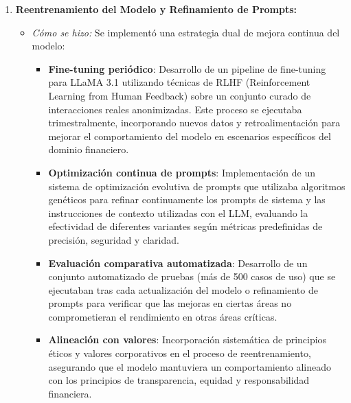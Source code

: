 \documentclass[12pt]{article}
\begin{document}
\begin{enumerate}
\begin{itemize}
            \item \textit{Resultados clave:} Las auditorías realizadas han identificado 23 oportunidades de mejora, de las cuales 17 ya han sido implementadas, resultando en una mejora del 12%
            \item \textit{Propósito:} Este enfoque sistemático garantiza la evaluación periódica y mejora del sistema, conforme al Art. 7.3.5 de la ISO/IEC 23894:2023 que establece la necesidad de "evaluaciones periódicas independientes de la efectividad de las medidas de gestión de riesgos".
        \end{itemize}
    \item \textbf{Reentrenamiento del Modelo y Refinamiento de Prompts:}
        \begin{itemize}
            \item \textit{Cómo se hizo:} Se implementó una estrategia dual de mejora continua del modelo:
            \begin{itemize}
                \item \textbf{Fine-tuning periódico}: Desarrollo de un pipeline de fine-tuning para LLaMA 3.1 utilizando técnicas de RLHF (Reinforcement Learning from Human Feedback) sobre un conjunto curado de interacciones reales anonimizadas. Este proceso se ejecutaba trimestralmente, incorporando nuevos datos y retroalimentación para mejorar el comportamiento del modelo en escenarios específicos del dominio financiero.
                \item \textbf{Optimización continua de prompts}: Implementación de un sistema de optimización evolutiva de prompts que utilizaba algoritmos genéticos para refinar continuamente los prompts de sistema y las instrucciones de contexto utilizadas con el LLM, evaluando la efectividad de diferentes variantes según métricas predefinidas de precisión, seguridad y claridad.
                \item \textbf{Evaluación comparativa automatizada}: Desarrollo de un conjunto automatizado de pruebas (más de 500 casos de uso) que se ejecutaban tras cada actualización del modelo o refinamiento de prompts para verificar que las mejoras en ciertas áreas no comprometieran el rendimiento en otras áreas críticas.
                \item \textbf{Alineación con valores}: Incorporación sistemática de principios éticos y valores corporativos en el proceso de reentrenamiento, asegurando que el modelo mantuviera un comportamiento alineado con los principios de transparencia, equidad y responsabilidad financiera.

\end{itemize}
\end{itemize}
\end{enumerate}
\end{document}
